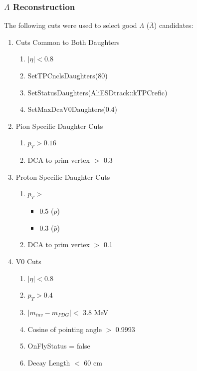 \documentclass[../AnalysisNoteJBuxton.tex]{subfiles}
\begin{document}
\subsubsection{\texorpdfstring{$\Lambda$}{TEXT} Reconstruction}
\label{LambdaReconstruction}

The following cuts were used to select good $\Lambda$ ($\bar{\Lambda}$) candidates:

\begin{enumerate}
 \item{Cuts Common to Both Daughters}
 \begin{enumerate}
  \item $|\eta| < 0.8$
  \item SetTPCnclsDaughters(80)
  \item SetStatusDaughters(AliESDtrack::kTPCrefic)
  \item SetMaxDcaV0Daughters(0.4)
 \end{enumerate}


 \item Pion Specific Daughter Cuts
 \begin{enumerate}
  \item $p_{T} > 0.16$
  \item DCA to prim vertex $>$ 0.3
 \end{enumerate} 
 
 \item Proton Specific Daughter Cuts
  \begin{enumerate}
  \item $p_{T} > $
  \begin{itemize}
   \item 0.5 ($p$)
   \item 0.3 ($\bar{p}$)
  \end{itemize}
   \item DCA to prim vertex $>$ 0.1 
 \end{enumerate} 
 
 \item V0 Cuts
 \begin{enumerate}
  \item $|\eta| < 0.8$
  \item $p_{T} > 0.4$
  \item $|m_{inv} - m_{PDG}| <$ 3.8 MeV
  \item Cosine of pointing angle $>$ 0.9993
  \item OnFlyStatus = false
  \item Decay Length $<$ 60 cm
 \end{enumerate}  
 
\end{enumerate}
\end{document}
